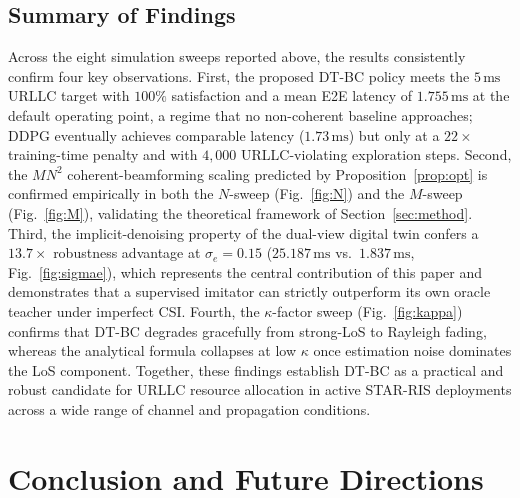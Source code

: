 \documentclass[journal]{IEEEtran}
\begin{document}
\subsection{Summary of Findings}

Across the eight simulation sweeps reported above, the results
consistently confirm four key observations. First, the proposed
DT-BC policy meets the $5\,\text{ms}$ URLLC target with $100\%$
satisfaction and a mean E2E latency of $1.755\,\text{ms}$ at the
default operating point, a regime that no non-coherent baseline
approaches; DDPG eventually achieves comparable latency
($1.73\,\text{ms}$) but only at a $22\!\times$ training-time penalty
and with $4{,}000$ URLLC-violating exploration steps. Second, the
$MN^2$ coherent-beamforming scaling predicted by
Proposition~\ref{prop:opt} is confirmed empirically in both the
$N$-sweep (Fig.~\ref{fig:N}) and the $M$-sweep (Fig.~\ref{fig:M}),
validating the theoretical framework of Section~\ref{sec:method}.
Third, the implicit-denoising property of the dual-view digital twin
confers a $13.7\!\times$ robustness advantage at $\sigma_e\!=\!0.15$
($25.187\,\text{ms}$ vs.\ $1.837\,\text{ms}$, Fig.~\ref{fig:sigmae}),
which represents the central contribution of this paper and
demonstrates that a supervised imitator can strictly outperform its
own oracle teacher under imperfect CSI. Fourth, the $\kappa$-factor
sweep (Fig.~\ref{fig:kappa}) confirms that DT-BC degrades gracefully
from strong-LoS to Rayleigh fading, whereas the analytical formula
collapses at low $\kappa$ once estimation noise dominates the LoS
component. Together, these findings establish DT-BC as a practical
and robust candidate for URLLC resource allocation in active
STAR-RIS deployments across a wide range of channel and propagation
conditions.

\section{Conclusion and Future Directions}
\label{sec:conclusion}
\end{document}
